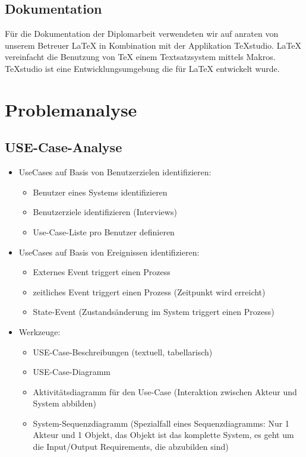 \section{Dokumentation}
Für die Dokumentation der Diplomarbeit verwendeten wir auf anraten von unserem Betreuer LaTeX in Kombination mit der Applikation TeXstudio.
LaTeX vereinfacht die Benutzung von TeX einem Textsatzsystem mittels Makros. TeXstudio ist eine Entwicklungsumgebung die für LaTeX entwickelt wurde. \cite{Latex}
\chapter{Problemanalyse}
\section{USE-Case-Analyse}
\begin{itemize}
	\item UseCases auf Basis von Benutzerzielen identifizieren: 
	\begin{itemize}
		\item Benutzer eines Systems identifizieren
		\item Benutzerziele identifizieren (Interviews)
		\item Use-Case-Liste pro Benutzer definieren
	\end{itemize}
	\item UseCases auf Basis von Ereignissen identifizieren: 
	\begin{itemize}
		\item Externes Event triggert einen Prozess
		\item zeitliches Event triggert einen Prozess (Zeitpunkt wird erreicht) 
		\item State-Event (Zustandsänderung im System triggert einen Prozess)
	\end{itemize}
	\item Werkzeuge:
	\begin{itemize}
		\item USE-Case-Beschreibungen (textuell, tabellarisch)
		\item USE-Case-Diagramm
		\item Aktivitätsdiagramm für den Use-Case (Interaktion zwischen Akteur und System abbilden)
		\item System-Sequenzdiagramm (Spezialfall eines Sequenzdiagramms: Nur 1 Akteur und 1 Objekt, das Objekt ist das komplette System, es geht um die Input/Output Requirements, die abzubilden sind)
	\end{itemize}
\end{itemize}

